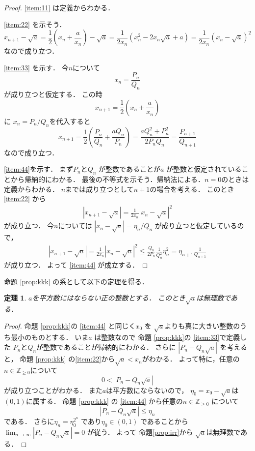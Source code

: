 \documentclass[leqno, a4paper, 12pt]{jsarticle}
\newtheorem{thm}{定理}
\newcommand{\zz}{\mathbb{Z}}
\begin{document}
\begin{proof}

\ref{item:11}
は定義からわかる．

\ref{item:22}
を示そう．
\[
x_{n+1}-\sqrt{a}
=
\frac{1}{2}\left(x_{n}+\frac{a}{x_{n}}\right)
-\sqrt{a}
=\frac{1}{2x_{n}}
\left(x_{n}^{2}-2x_{n}\sqrt{a}+a\right)
=\frac{1}{2x_{n}}(x_{n}-\sqrt{a})^{2}
\]
なので成り立つ．

\ref{item:33}
を示す．
今$n$について
\[
x_{n}=\frac{P_{n}}{Q_{n}}
\]
が成り立つと仮定する．
この時
\[
x_{n+1}=\frac{1}{2}\left(x_{n}+\frac{a}{x_{n}}\right)
\]
に
$x_{n}=P_{n}/Q_{n}$を代入すると
\[
x_{n+1}=\frac{1}{2}\left(\frac{P_{n}}{Q_{n}}+\frac{aQ_{n}}{P_{n}}\right)
=\frac{aQ_{n}^{2}+P_{n}^{2}}{2P_{n}Q_{n}}
=\frac{P_{n+1}}{Q_{n+1}}
\]
なので成り立つ．


\ref{item:44}を示す．
まず$P_{n}$と$Q_{n}$
が整数であることが$a$
が整数と仮定されていることから帰納的にわかる．
最後の不等式を示そう．帰納法による．$n=0$のときは定義からわかる．
$n$までは成り立つとして$n+1$の場合を考える．
このとき
\ref{item:22}
から
\begin{align*}
|x_{n+1}-{\sqrt{a}}|
=
\frac{1}{2x_{n}}|x_{n}-\sqrt{a}|^{2}
\end{align*}
が成り立つ．
今$n$については
$|x_{n}-\sqrt{a}|=\eta_{n}/Q_{n}$
が成り立つと仮定しているので，
\begin{align*}
|x_{n+1}-{\sqrt{a}}|
=\frac{1}{2x_{n}}|x_{n}-\sqrt{a}|^{2}
\le 
\frac{Q_{n}}{2P_{n}}\frac{1}{Q_{n}^{2}}\eta_{n}^{2}
=
\eta_{n+1}\frac{1}{Q_{n+1}}
\end{align*}
が成り立つ．
よって
\ref{item:44}
が成立する．
\end{proof}

命題
\ref{prop:kkk}
の系として以下の定理を得る．
\begin{thm}
$a$を平方数にはならない正の整数とする．
このとき$\sqrt{a}$は無理数である．
\end{thm}
\begin{proof}
命題
\ref{prop:kkk}の
\ref{item:44}
と同じく$x_{0}$
を
$\sqrt{a}$よりも真に大きい整数のうち最小のものとする．
いま$a$
は整数なので
命題
\ref{prop:kkk}の
\ref{item:33}で定義した
$P_{n}$と$Q_{n}$が整数であることが帰納的にわかる．
さらに
$|P_{n}-Q_{n}\sqrt{a}|$
を考えると，
命題
\ref{prop:kkk}
の\ref{item:22}から$\sqrt{a}<x_{n}$がわかる．
よって特に，任意の$n\in \zz_{\ge 0}$について
\[
0<|P_{n}-Q_{n}\sqrt{a}|
\]
が成り立つことがわかる．
また$a$は平方数にならないので，
$\eta_{0}=x_{0}-\sqrt{a}$は
$(0, 1)$に属する．
命題
\ref{prop:kkk}
の
\ref{item:44}
から任意の$n\in \zz_{\ge 0}$
について
\[
|P_{n}-Q_{n}\sqrt{a}|\le \eta_{n}
\]
である．
さらに$\eta_{n}=\eta_{0}^{2^{n}}$
であり$\eta_{0}\in (0, 1)$
であることから
$\lim_{n \to \infty}|P_{n}-Q_{n}\sqrt{a}|=0$
が従う．
よって
命題\ref{prop:irr}から
$\sqrt{a}$は無理数である．
\end{proof}
\end{document}
